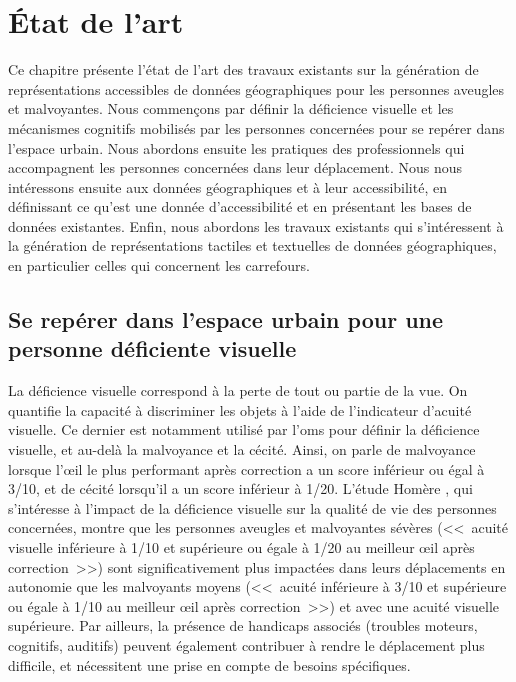 \chapter{État de l'art}

\label{chap:etat_art}

Ce chapitre présente l'état de l'art des travaux existants sur la génération de représentations accessibles de données géographiques pour les personnes aveugles et malvoyantes. Nous commençons par définir la déficience visuelle et les mécanismes cognitifs mobilisés par les personnes concernées pour se repérer dans l'espace urbain. Nous abordons ensuite les pratiques des professionnels qui accompagnent les personnes concernées dans leur déplacement. Nous nous intéressons ensuite aux données géographiques et à leur accessibilité, en définissant ce qu'est une donnée d'accessibilité et en présentant les bases de données existantes. Enfin, nous abordons les travaux existants qui s'intéressent à la génération de représentations tactiles et textuelles de données géographiques, en particulier celles qui concernent les carrefours.

\section{Se repérer dans l'espace urbain pour une personne déficiente visuelle}

%
%

La déficience visuelle correspond à la perte de tout ou partie de la vue. On quantifie la capacité à discriminer les objets à l'aide de l'indicateur d'acuité visuelle. Ce dernier est notamment utilisé par l'\gls{oms} pour définir la déficience visuelle, et au-delà la malvoyance et la cécité. Ainsi, on parle de malvoyance lorsque l'œil le plus performant après correction a un score inférieur ou égal à 3/10, et de cécité lorsqu'il a un score inférieur à 1/20. L'étude Homère \citep{homere_2023}, qui s'intéresse à l'impact de la déficience visuelle sur la qualité de vie des personnes concernées, montre que les personnes aveugles et malvoyantes sévères (<<~acuité visuelle inférieure à 1/10 et supérieure ou égale à 1/20 au meilleur œil après correction~>>) sont significativement plus impactées dans leurs déplacements en autonomie que les malvoyants moyens (<<~acuité inférieure à 3/10 et supérieure ou égale à 1/10 au meilleur œil après correction~>>) et avec une acuité visuelle supérieure. Par ailleurs, la présence de handicaps associés (troubles moteurs, cognitifs, auditifs) peuvent également contribuer à rendre le déplacement plus difficile, et nécessitent une prise en compte de besoins spécifiques.

